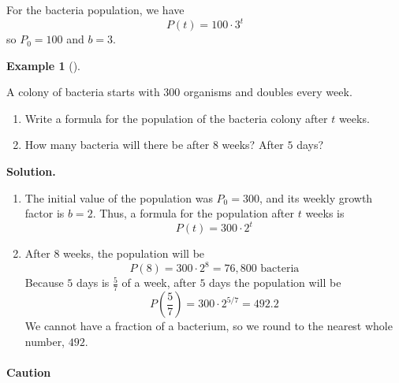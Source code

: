 \documentclass[10pt,]{book}
\theoremstyle{plain}
\theoremstyle{definition}
\theoremstyle{definition}
\theoremstyle{definition}
\newtheorem{example}[theorem]{Example}
\theoremstyle{definition}
\theoremstyle{definition}
\numberwithin{equation}{section}
\begin{document}
    For the bacteria population, we have
    \begin{equation*}P(t) = 100 \cdot 3^t\end{equation*}
    so \(P_0 = 100\) and \(b = 3\).
%
\begin{example}[]\label{example-bacteria}

    A colony of bacteria starts with \(300\) organisms and doubles every week.
    \leavevmode%
\begin{enumerate}[label=*\alph**]
\item\hypertarget{li-606}{}Write a formula for the population of the bacteria colony after \(t\) weeks.\item\hypertarget{li-607}{}How many bacteria will there be after \(8\) weeks? After \(5\) days?\end{enumerate}

%
\par\medskip\noindent%
\textbf{Solution.}\quad \leavevmode%
\begin{enumerate}[label=*\alph**]
\item\hypertarget{li-608}{}The initial value of the population was \(P_0 = 300\), and its weekly growth factor is \(b = 2\). Thus, a formula for the population after \(t\) weeks is
        \begin{equation*}P(t) = 300 \cdot 2^t\end{equation*}\item\hypertarget{li-609}{}After \(8\) weeks, the population will be
        \begin{equation*}P(8) = 300 \cdot 2^8 = 76,800 \text{ bacteria}\end{equation*}
        Because \(5\) days is \(\frac{5}{7}\) of a week, after \(5\) days the population will be
        \begin{equation*}P\left(\frac{5}{7}\right)= 300 \cdot 2^{5/7} = 492.2\end{equation*}
        We cannot have a fraction of a bacterium, so we round to the nearest whole number, \(492\).\end{enumerate}
\end{example}
\typeout{************************************************}
\typeout{************************************************}
\paragraph[Caution]{Caution}\label{paragraphs-55}
\end{document}
